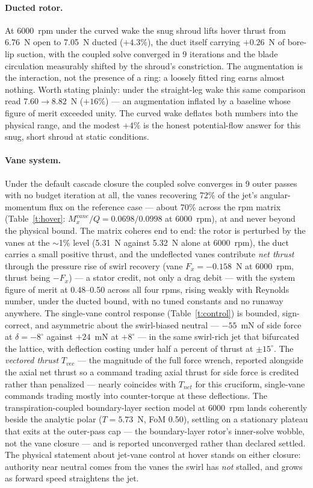 \documentclass[]{aiaa-tc}%
\begin{document}
\paragraph{Ducted rotor.} At 6000~rpm under the curved wake the snug
shroud lifts hover thrust from 6.76~N open to 7.05~N ducted
($+4.3\%$), the duct itself carrying $+0.26$~N of bore-lip suction,
with the coupled solve converged in 9 iterations and the blade
circulation measurably shifted by the shroud's constriction. The
augmentation is the interaction, not the presence of a ring: a
loosely fitted ring earns almost nothing. Worth stating plainly: under
the straight-leg wake this same comparison read $7.60 \to 8.82$~N
($+16\%$) --- an augmentation inflated by a baseline whose figure of
merit exceeded unity. The curved wake deflates both numbers into the
physical range, and the modest $+4\%$ is the honest potential-flow
answer for this snug, short shroud at static conditions.

\paragraph{Vane system.} Under the default
cascade closure the coupled solve converges in 9 outer passes with no
budget iteration at all, the vanes recovering 72\% of the jet's
angular-momentum flux on the reference case --- about 70\% across the
rpm matrix (Table~\ref{t:hover}: $M_x^{vane}/Q = 0.0698/0.0998$ at
6000~rpm), at and never beyond the physical bound. The
matrix coheres end to end: the rotor is perturbed by the vanes at the
$\sim$1\% level (5.31~N against 5.32~N alone at 6000~rpm), the duct
carries a small positive thrust, and the undeflected vanes contribute
\emph{net thrust} through the pressure rise of swirl recovery (vane
$F_x = -0.158$~N at 6000~rpm, thrust being $-F_x$) --- a stator
credit, not only a drag debit --- with the system figure of merit at
0.48--0.50 across all four rpms, rising weakly with Reynolds number,
under the ducted bound, with no tuned constants and no runaway
anywhere. The single-vane control response (Table~\ref{t:control}) is
bounded, sign-correct, and asymmetric about the swirl-biased neutral
--- $-55$~mN of side force at $\delta = -8^\circ$ against $+24$~mN at
$+8^\circ$ --- in the same swirl-rich jet that bifurcated the lattice,
with deflection costing under half a percent of thrust at
$\pm 15^\circ$. The \emph{vectored thrust} $T_{vec}$ --- the magnitude
of the full force wrench, reported alongside the axial net thrust so a
command trading axial thrust for side force is credited rather than
penalized --- nearly coincides with $T_{net}$ for this cruciform,
single-vane commands trading mostly into counter-torque at these
deflections. The transpiration-coupled boundary-layer section model at
6000~rpm lands coherently beside the analytic polar ($T = 5.73$~N, FoM
0.50), settling on a stationary plateau that exits at the outer-pass
cap --- the boundary-layer rotor's inner-solve wobble, not the vane
closure --- and is reported unconverged rather than declared settled.
The physical statement about jet-vane
control at hover stands on either closure: authority near neutral
comes from the vanes the swirl has \emph{not} stalled, and grows as
forward speed straightens the jet.
\end{document}
